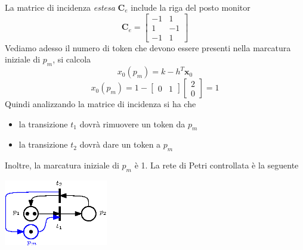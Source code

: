 \documentclass[10pt, letterpaper]{report}
\begin{document}
La matrice di incidenza \textit{estesa} $\mathbf C_e$ include la riga del posto monitor 
$$ \mathbf C_e=\begin{bmatrix}
    -1 & 1 \\ 
    1 & -1\\ 
    -1 & 1
    \end{bmatrix}$$
Vediamo adesso il numero di token che devono essere presenti nella marcatura iniziale di $p_m$, si calcola 
$$ x_0(p_m)=k-h^T\mathbf x_0$$
$$ x_0(p_m)=1-\begin{bmatrix}
    0 & 1
\end{bmatrix}\begin{bmatrix}
    2\\ 0
\end{bmatrix}=1$$
Quindi analizzando la matrice di incidenza si ha che\begin{itemize}
    \item la transizione $t_1$ dovrà rimuovere un token da $p_m$
    \item la transizione $t_2$ dovrà dare un token a $p_m$
\end{itemize}
Inoltre, la marcatura iniziale di $p_m$ è 1. La rete di Petri controllata è la seguente
\begin{center}
    \includegraphics[width=0.34\textwidth]{images/controlloPetri2.eps}
\end{center}
\end{document}
